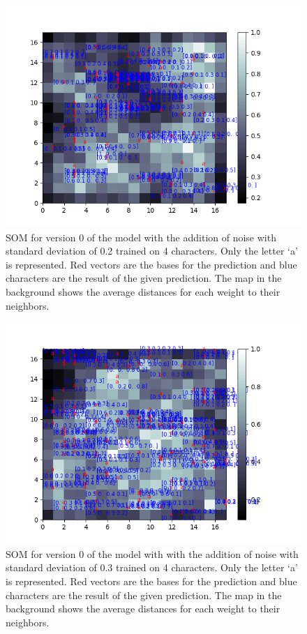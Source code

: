 \begin{figure}[!htb]
	\centering
	\includegraphics[width=\textwidth]{images/SOM_graphics/17x17_4d_noise_02_v0/a.png}
	\caption{SOM for version 0 of the model with the addition of noise with standard deviation of 0.2 trained on 4 characters. Only the letter `a' is represented. Red vectors are the bases for the prediction and blue characters are the result of the given prediction. The map in the background shows the average distances for each weight to their neighbors.}
	\label{fig:4d_noise_02_a}
\end{figure}

\begin{figure}[!htb]
	\centering
	\includegraphics[width=\textwidth]{images/SOM_graphics/17x17_4d_noise_03_v0/a.png}
	\caption{SOM for version 0 of the model with with the addition of noise with standard deviation of 0.3 trained on 4 characters. Only the letter `a' is represented. Red vectors are the bases for the prediction and blue characters are the result of the given prediction. The map in the background shows the average distances for each weight to their neighbors.}
	\label{fig:4d_noise_03_a}
\end{figure}

